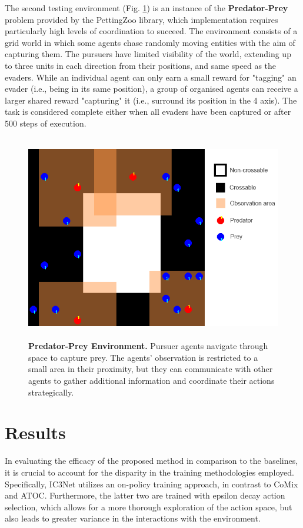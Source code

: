 \documentclass[a4paper,singleside,12pt]{report} %
\begin{document}
The second testing environment (Fig. \ref{fig:pursuit}) is an instance of the \textbf{Predator-Prey} problem provided by the PettingZoo library, which implementation requires particularly high levels of coordination to succeed. The environment consists of a grid world in which some agents chase randomly moving entities with the aim of capturing them. The pursuers have limited visibility of the world, extending up to three units in each direction from their positions, and same speed as the evaders. While an individual agent can only earn a small reward for "tagging" an evader (i.e., being in its same position), a group of organised agents can receive a larger shared reward "capturing" it (i.e., surround its position in the 4 axis). The task is considered complete either when all evaders have been captured or after 500 steps of execution.

\begin{figure}
  \centering
  \includegraphics[height=9cm]{images/pursuit.png}
  \caption{\textbf{Predator-Prey Environment.} Pursuer agents navigate through space to capture prey. The agents' observation is restricted to a small area in their proximity, but they can communicate with other agents to gather additional information and coordinate their actions strategically.}
  \label{fig:pursuit}
\end{figure}


\section{Results}\label{results}
In evaluating the efficacy of the proposed method in comparison to the baselines, it is crucial to account for the disparity in the training methodologies employed. Specifically, IC3Net utilizes an on-policy training approach, in contrast to CoMix and ATOC. Furthermore, the latter two are trained with epsilon decay action selection, which allows for a more thorough exploration of the action space, but also leads to greater variance in the interactions with the environment.
\end{document}
